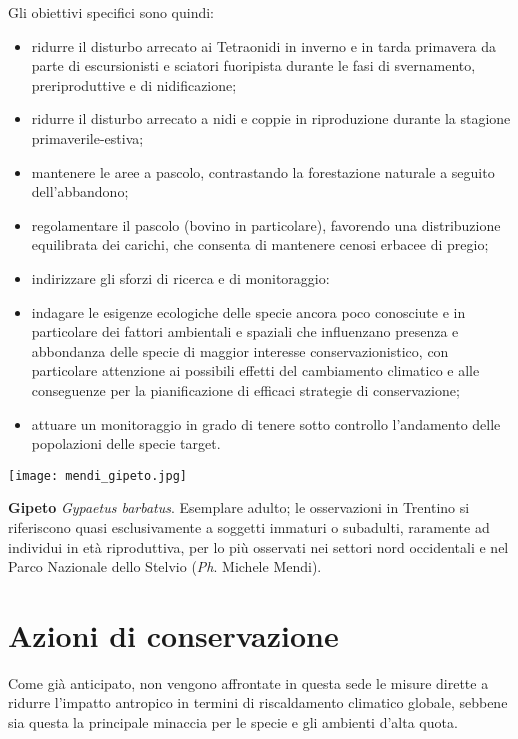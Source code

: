 \documentclass[10pt,twoside,openany,x11names,svgnames,italian,a5paper,dvipsnames,table]{memoir}
\newcommand\chapterillustration{}
\newcommand{\ph}{\emph{Ph}. }
\begin{document}
Gli obiettivi specifici sono quindi:
\begin{itemize}\itemsep0pt
  \item ridurre il disturbo arrecato ai Tetraonidi in inverno e in tarda primavera da parte di escursionisti e sciatori fuoripista durante le fasi di svernamento, preriproduttive e di nidificazione;
  \item ridurre il disturbo arrecato a nidi e coppie in riproduzione durante la stagione primaverile-estiva;
  \item mantenere le aree a pascolo, contrastando la forestazione naturale a seguito dell’abbandono;
  \item regolamentare il pascolo (bovino in particolare), favorendo una distribuzione equilibrata dei carichi, che consenta di mantenere cenosi erbacee di pregio;
  \item indirizzare gli sforzi di ricerca e di monitoraggio:
  \item indagare le esigenze ecologiche delle specie ancora poco conosciute e in particolare dei fattori ambientali e spaziali che influenzano presenza e abbondanza delle specie di maggior interesse conservazionistico, con particolare attenzione ai possibili effetti del cambiamento climatico e alle conseguenze per la pianificazione di efficaci strategie di conservazione;
  \item attuare un monitoraggio in grado di tenere sotto controllo l’andamento delle popolazioni delle specie target.
\end{itemize}


\vspace*{\fill}
\begin{center}
\texttt{[image: mendi\_gipeto.jpg]}
\end{center}
\captionsetup{width=1\textwidth}
\caption*{\textbf{Gipeto} \emph{Gypaetus barbatus}. Esemplare adulto; le osservazioni in Trentino si riferiscono quasi esclusivamente a soggetti immaturi o subadulti, raramente ad individui in età riproduttiva, per lo più osservati nei settori nord occidentali e nel Parco Nazionale dello Stelvio (\ph Michele Mendi).}
\vspace*{\fill}

\chapter{Azioni di conservazione}
\renewcommand\chapterillustration{5.JPG}

Come già anticipato, non vengono affrontate in questa sede le misure dirette a ridurre l'impatto antropico in termini di riscaldamento climatico globale, sebbene sia questa la principale minaccia per le specie e gli ambienti d'alta quota.
\end{document}
